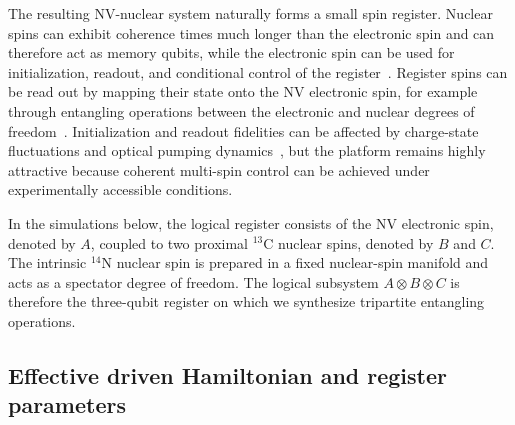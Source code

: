 \documentclass[
  aps,
  pra,
  reprint,            %
  superscriptaddress, %
  amsmath,amssymb,
  notitlepage
]{revtex4-2}
\begin{document}
The resulting NV-nuclear system naturally forms a small spin register. Nuclear spins can exhibit coherence times much longer than the electronic spin and can therefore act as memory qubits, while the electronic spin can be used for initialization, readout, and conditional control of the register~\cite{Taminiau,childress}. Register spins can be read out by mapping their state onto the NV electronic spin, for example through entangling operations between the electronic and nuclear degrees of freedom~\cite{Rong2015,Wei2015}. Initialization and readout fidelities can be affected by charge-state fluctuations and optical pumping dynamics~\cite{taminiaudetection,neumannsingle}, but the platform remains highly attractive because coherent multi-spin control can be achieved under experimentally accessible conditions.

In the simulations below, the logical register consists of the NV electronic spin, denoted by $A$, coupled to two proximal $^{13}\mathrm{C}$ nuclear spins, denoted by $B$ and $C$. The intrinsic $^{14}\mathrm{N}$ nuclear spin is prepared in a fixed nuclear-spin manifold and acts as a spectator degree of freedom. The logical subsystem $A\otimes B\otimes C$ is therefore the three-qubit register on which we synthesize tripartite entangling operations.

\subsection{Effective driven Hamiltonian and register parameters}
\label{sec:spin_model}
\end{document}
